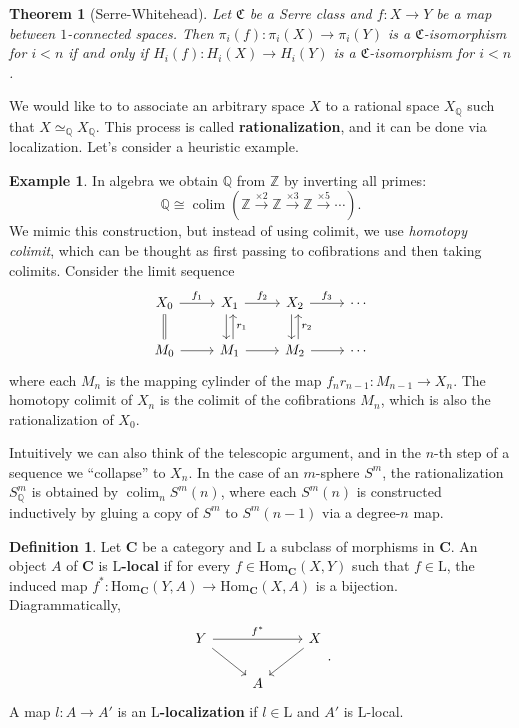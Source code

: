 \documentclass[psamsfonts]{amsart}
\newtheorem{thm}{Theorem}[section]
\theoremstyle{definition}
\newtheorem{defn}{Definition}[section]
\newtheorem{exmp}{Example}[section]
\newcommand{\Q}{\mathbb{Q}}
\newcommand{\Z}{\mathbb{Z}}
\newcommand{\Hom}{\mathrm{Hom}}
\DeclareMathOperator{\colim}{colim}
\numberwithin{equation}{section}
\begin{document}
\begin{thm}[Serre-Whitehead]
Let $\mathfrak{C}$ be a Serre class and $f:X\to Y$ be a map between $1$-connected spaces. Then $\pi_i(f):\pi_i(X)\to\pi_i(Y)$ is a $\mathfrak{C}$-isomorphism for $i<n$ if and only if $H_i(f):H_i(X)\to H_i(Y)$ is a $\mathfrak{C}$-isomorphism for $i<n$.
\end{thm}

We would like to to associate an arbitrary space $X$ to a rational space $X_\Q$ such that $X\simeq_\Q X_\Q$. This process is called \textbf{rationalization}, and it can be done via localization. Let's consider a heuristic example.

\begin{exmp}

In algebra we obtain $\Q$ from $\Z$ by inverting all primes:
\[\Q\cong\colim\left(\Z\xrightarrow{\times2}\Z\xrightarrow{\times3}\Z\xrightarrow{\times5}\cdots\right).\]
We mimic this construction, but instead of using colimit, we use \textit{homotopy colimit}, which can be thought as first passing to cofibrations and then taking colimits. %
Consider the limit sequence
\[\begin{tikzcd}
X_0\arrow[d,equal]\arrow[r,"f_1"]&X_1\arrow[d,shift right]\arrow[r,"f_2"]&X_2\arrow[d,shift right]\arrow[r,"f_3"]&\cdots\\
M_0\arrow[r]&M_1\arrow[u,"r_1"',shift right]\arrow[r]&M_2\arrow[u,"r_2"',shift right]\arrow[r]&\cdots
\end{tikzcd}\]
where each $M_n$ is the mapping cylinder of the map $f_nr_{n-1}:M_{n-1}\to X_n$. The homotopy colimit of $X_n$ is the colimit of the cofibrations $M_n$, which is also the rationalization of $X_0$.

Intuitively we can also think of the telescopic argument, and in the $n$-th step of a sequence we ``collapse'' to $X_n$. In the case of an $m$-sphere $S^m$, the rationalization $S^m_\Q$ is obtained by $\colim_n{S^m(n)}$, where each $S^m(n)$ is constructed inductively by gluing a copy of $S^m$ to $S^m(n-1)$ via a degree-$n$ map.
\end{exmp}

\begin{defn}
Let $\mathbf{C}$ be a category and $\mathrm{L}$ a subclass of morphisms in $\mathbf{C}$. An object $A$ of $\mathbf{C}$ is \textbf{$\mathrm{L}$-local} if for every $f\in\Hom_\mathbf{C}(X,Y)$ such that $f\in\mathrm{L}$, the induced map $f^\ast:\Hom_\mathbf{C}(Y,A)\to\Hom_\mathbf{C}(X,A)$ is a bijection. Diagrammatically,
\[\begin{tikzcd}
Y\arrow[dr]\arrow[rr,"f^\ast"]&&X\arrow[dl]\\
&A
\end{tikzcd}.\]
A map $l:A\to A'$ is an \textbf{$\mathrm{L}$-localization} if $l\in\mathrm{L}$ and $A'$ is $\mathrm{L}$-local.
\end{defn}
\end{document}
